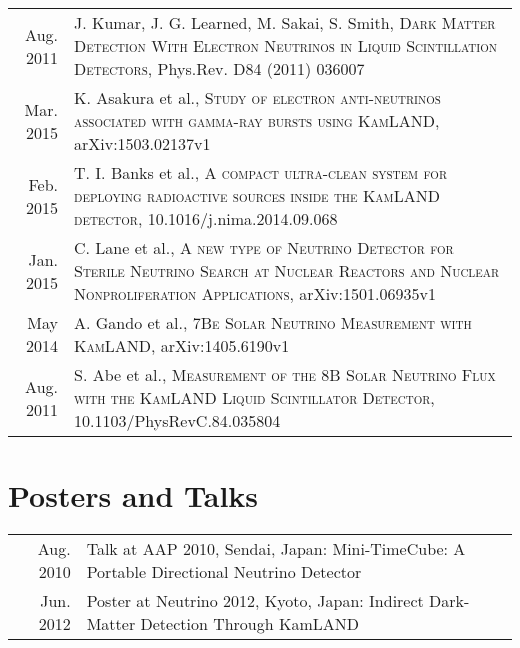 \documentclass[a4paper,10pt]{article} %
\begin{document}
\begin{tabular}{rp{11cm}}
	Aug. 2011 & J. Kumar, J. G. Learned, M. Sakai, S. Smith,
	\textsc{Dark Matter Detection With Electron Neutrinos in Liquid
	Scintillation Detectors}, Phys.Rev. D84 (2011) 036007\\

	Mar. 2015 & K. Asakura et al., \textsc{Study of electron anti-neutrinos
	associated with gamma-ray bursts using KamLAND}, arXiv:1503.02137v1\\
	Feb. 2015 & T. I. Banks et al., \textsc{A compact ultra-clean system for
	deploying radioactive sources inside the KamLAND detector},
	10.1016/j.nima.2014.09.068\\
	Jan. 2015 & C. Lane et al., \textsc{A new type of Neutrino Detector for
	Sterile Neutrino Search at Nuclear Reactors and Nuclear Nonproliferation
	Applications}, arXiv:1501.06935v1\\
	May 2014 & A. Gando et al., \textsc{7Be Solar Neutrino Measurement with
	KamLAND}, arXiv:1405.6190v1\\
	Aug. 2011 & S. Abe et al., \textsc{Measurement of the 8B Solar Neutrino
	Flux with the KamLAND Liquid Scintillator Detector},
	10.1103/PhysRevC.84.035804\\
\end{tabular}



\section{Posters and Talks}
\begin{tabular}{rp{11cm}}
	Aug. 2010 & Talk at AAP 2010, Sendai, Japan: Mini-TimeCube: A Portable
	Directional Neutrino Detector\\
	Jun. 2012 & Poster at Neutrino 2012, Kyoto, Japan: Indirect Dark-Matter
	Detection Through KamLAND\\
\end{tabular}

\end{document}
